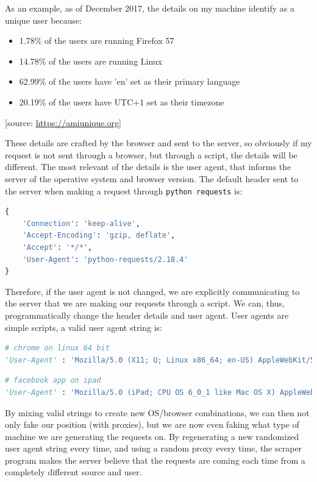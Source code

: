 \documentclass[LaM,oneside,binding=0.6cm]{sapthesis}
\begin{document}
As an example, as of December 2017, the details on my machine identify as a unique user because:
\begin{itemize}
\item 1.78\% of the users are running Firefox 57
\item 14.78\% of the users are running Linux
\item 62.99\% of the users have 'en' set as their primary language
\item 20.19\% of the users have UTC+1 set as their timezone
\end{itemize}
[source: \url{https://amiunique.org}]

These details are crafted by the browser and sent to the server, so obviously if my request is not sent through a browser, but through a script, the details will be different. The most relevant of the details is the user agent, that informs the server of the operative system and browser version. The default header sent to the server when making a request through \texttt{python requests} is:

\begin{lstlisting}[language=python]
{
	'Connection': 'keep-alive', 
	'Accept-Encoding': 'gzip, deflate', 
	'Accept': '*/*', 
	'User-Agent': 'python-requests/2.18.4'
}
\end{lstlisting} 

Therefore, if the user agent is not changed, we are explicitly communicating to the server that we are making our requests through a script.
We can, thus, programmatically change the header details and user agent. User agents are simple scripts, a valid user agent string is:

\begin{lstlisting}[language=python]
# chrome on linux 64 bit
'User-Agent' : 'Mozilla/5.0 (X11; U; Linux x86_64; en-US) AppleWebKit/540.0 (KHTML,like Gecko) Chrome/9.1.0.0 Safari/540.0'
\end{lstlisting}

\begin{lstlisting}[language=python]
# facebook app on ipad
'User-Agent' : 'Mozilla/5.0 (iPad; CPU OS 6_0_1 like Mac OS X) AppleWebKit/536.26 (KHTML, like Gecko) Mobile/10A523 [FBAN/FBIOS;FBAV/6.0.1;FBBV/180945;FBDV/iPad2,1;FBMD/iPad;FBSN/iPhone OS;FBSV/6.0.1;FBSS/1; FBCR/;FBID/tablet;FBLC/en_US;FBOP/1]'
\end{lstlisting}

By mixing valid strings to create new OS/browser combinations, we can then not only fake our position (with proxies), but we are now even faking what type of machine we are generating the requests on. By regenerating a new randomized user agent string every time, and using a random proxy every time, the scraper program makes the server believe that the requests are coming each time from a completely different source and user.
\end{document}

